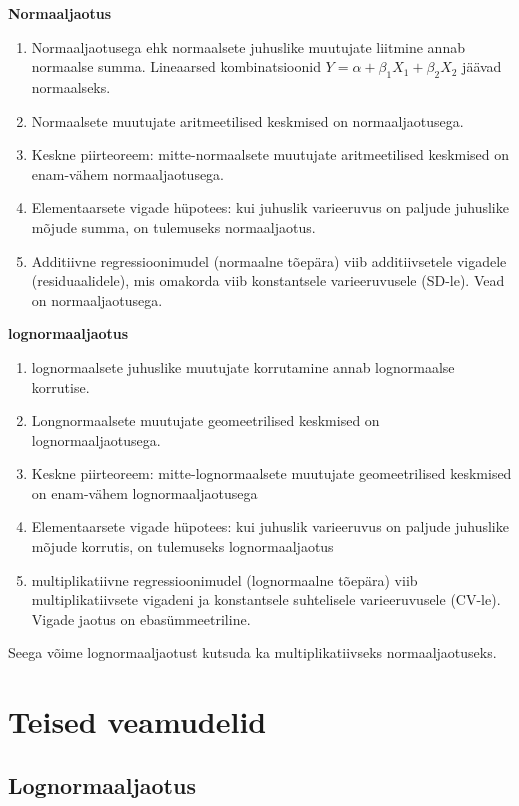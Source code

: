 \documentclass[]{book}
\begin{document}
\textbf{Normaaljaotus}

\begin{enumerate}
\def\labelenumi{\arabic{enumi}.}
\item
  Normaaljaotusega ehk normaalsete juhuslike muutujate liitmine annab
  normaalse summa. Lineaarsed kombinatsioonid
  \(Y= \alpha + \beta_1X_1 + \beta_2X_2\) jäävad normaalseks.
\item
  Normaalsete muutujate aritmeetilised keskmised on normaaljaotusega.
\item
  Keskne piirteoreem: mitte-normaalsete muutujate aritmeetilised
  keskmised on enam-vähem normaaljaotusega.
\item
  Elementaarsete vigade hüpotees: kui juhuslik varieeruvus on paljude
  juhuslike mõjude summa, on tulemuseks normaaljaotus.
\item
  Additiivne regressioonimudel (normaalne tõepära) viib additiivsetele
  vigadele (residuaalidele), mis omakorda viib konstantsele
  varieeruvusele (SD-le). Vead on normaaljaotusega.
\end{enumerate}

\textbf{lognormaaljaotus}

\begin{enumerate}
\def\labelenumi{\arabic{enumi}.}
\item
  lognormaalsete juhuslike muutujate korrutamine annab lognormaalse
  korrutise.
\item
  Longnormaalsete muutujate geomeetrilised keskmised on
  lognormaaljaotusega.
\item
  Keskne piirteoreem: mitte-lognormaalsete muutujate geomeetrilised
  keskmised on enam-vähem lognormaaljaotusega
\item
  Elementaarsete vigade hüpotees: kui juhuslik varieeruvus on paljude
  juhuslike mõjude korrutis, on tulemuseks lognormaaljaotus
\item
  multiplikatiivne regressioonimudel (lognormaalne tõepära) viib
  multiplikatiivsete vigadeni ja konstantsele suhtelisele varieeruvusele
  (CV-le). Vigade jaotus on ebasümmeetriline.
\end{enumerate}

Seega võime lognormaaljaotust kutsuda ka multiplikatiivseks
normaaljaotuseks.

\section{Teised veamudelid}\label{teised-veamudelid}

\subsection{Lognormaaljaotus}\label{lognormaaljaotus}
\end{document}
